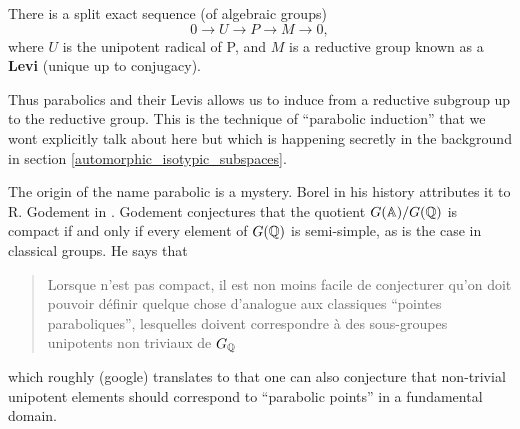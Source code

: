 \begin{Lemma}
    There is a split exact sequence (of algebraic groups)
    \[0 \to U \to P \to M \to 0,\]
    where \(U\) is the unipotent radical of P, and \(M\) is a reductive group known as a \textbf{Levi} (unique up to conjugacy).
\end{Lemma}

Thus parabolics and their Levis allows us to induce from a reductive subgroup up to the reductive group. This is the technique of ``parabolic induction'' \cite[Thm. 10]{bernsteinREPRESENTATIONSPADICGROUPS1992} that we wont explicitly talk about here but which is happening secretly in the background in section \ref{automorphic_isotypic_subspaces}.

\begin{Remark}
    The origin of the name parabolic is a mystery. Borel in his history \cite[VI.\S 2]{EssaysHistoryLie} attributes it to R. Godement in \cite{godementGroupesLineairesAlgebriques}. Godement conjectures that the quotient \(G(\A) / G(\Q)\) is compact if and only if every element of \(G(\Q)\) is semi-simple, as is the case in classical groups.  He says that 
    \begin{quote}
        Lorsque n'est pas compact, il est non moins facile de conjecturer qu’on doit pouvoir définir quelque chose d’analogue aux classiques ``pointes paraboliques'', lesquelles doivent correspondre à des  sous-groupes unipotents non triviaux de \(G_\Q\)
    \end{quote}
    which roughly (google) translates to that one can also conjecture that non-trivial unipotent elements should correspond to ``parabolic points'' in a fundamental domain.


\end{Remark}
